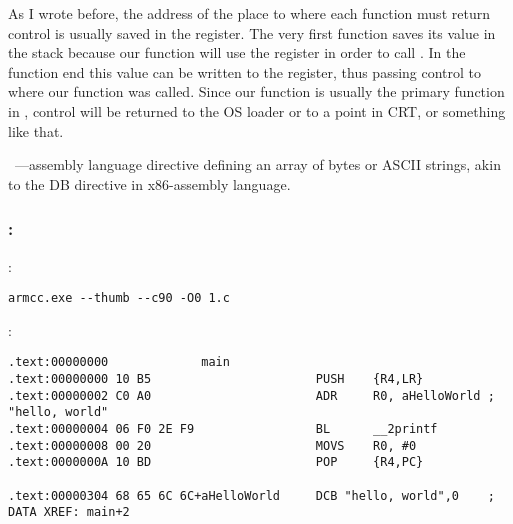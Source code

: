 {As I wrote before, the address of the place to where each function must return control is usually saved in the \LR
register}.
{The very first function saves its value in the stack because our
\main function will use the register in order to call \printf}.
{In the function end this value can be written to the \PC register, thus passing control to where our function was called}.
{Since our \main function is usually the primary function in \CCpp,
control will be returned to the \ac{OS} loader or to a point in \ac{CRT},
or something like that}.

{~---assembly language directive defining an array of bytes or ASCII strings, akin to the DB directive 
in x86-assembly language}.

\subsubsection{\NonOptimizingKeil: \ThumbMode}

:

\begin{lstlisting}
armcc.exe --thumb --c90 -O0 1.c 
\end{lstlisting}

:

\begin{lstlisting}[caption=\NonOptimizingKeil + \ThumbMode + \IDA]
.text:00000000             main
.text:00000000 10 B5                       PUSH    {R4,LR}
.text:00000002 C0 A0                       ADR     R0, aHelloWorld ; "hello, world"
.text:00000004 06 F0 2E F9                 BL      __2printf
.text:00000008 00 20                       MOVS    R0, #0
.text:0000000A 10 BD                       POP     {R4,PC}

.text:00000304 68 65 6C 6C+aHelloWorld     DCB "hello, world",0    ; DATA XREF: main+2
\end{lstlisting}

